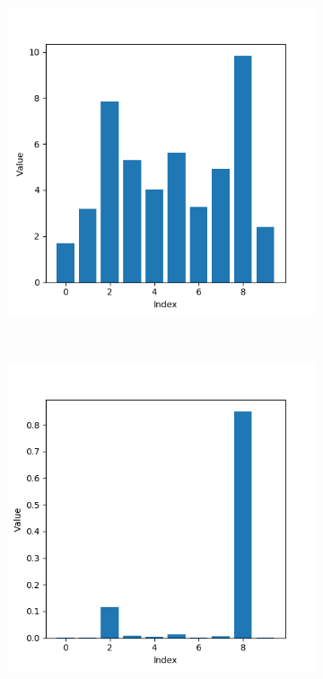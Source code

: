 \documentclass{kththesis}
\begin{document}
\begin{figure}[h]
    \centering
    \begin{subfigure}[b]{0.3\textwidth}
        \includegraphics[width=\textwidth]{softmax_in}
    \end{subfigure}
    ~ %
    \begin{subfigure}[b]{0.3\textwidth}
        \includegraphics[width=\textwidth]{softmax_t1}

\end{subfigure}
\end{figure}
\end{document}

